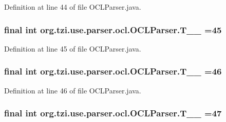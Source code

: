 Definition at line 44 of file O\-C\-L\-Parser.\-java.

\hypertarget{classorg_1_1tzi_1_1use_1_1parser_1_1ocl_1_1_o_c_l_parser_ae6ad4517bc192f2ec9659901e71326a9}{
\subsubsection[{T\-\_\-\-\_\-45}]{\setlength{\rightskip}{0pt plus 5cm}final int org.\-tzi.\-use.\-parser.\-ocl.\-O\-C\-L\-Parser.\-T\-\_\-\-\_ =45\hspace{0.3cm}{\ttfamily [static]}}}\label{classorg_1_1tzi_1_1use_1_1parser_1_1ocl_1_1_o_c_l_parser_ae6ad4517bc192f2ec9659901e71326a9}


Definition at line 45 of file O\-C\-L\-Parser.\-java.

\hypertarget{classorg_1_1tzi_1_1use_1_1parser_1_1ocl_1_1_o_c_l_parser_a8dc8e81bf19205be5df0475ac9de130c}{
\subsubsection[{T\-\_\-\-\_\-46}]{\setlength{\rightskip}{0pt plus 5cm}final int org.\-tzi.\-use.\-parser.\-ocl.\-O\-C\-L\-Parser.\-T\-\_\-\-\_ =46\hspace{0.3cm}{\ttfamily [static]}}}\label{classorg_1_1tzi_1_1use_1_1parser_1_1ocl_1_1_o_c_l_parser_a8dc8e81bf19205be5df0475ac9de130c}


Definition at line 46 of file O\-C\-L\-Parser.\-java.

\hypertarget{classorg_1_1tzi_1_1use_1_1parser_1_1ocl_1_1_o_c_l_parser_a09fee6e13cf0bcd30e88efb12cf3fdf3}{
\subsubsection[{T\-\_\-\-\_\-47}]{\setlength{\rightskip}{0pt plus 5cm}final int org.\-tzi.\-use.\-parser.\-ocl.\-O\-C\-L\-Parser.\-T\-\_\-\-\_ =47\hspace{0.3cm}{\ttfamily [static]}}}\label{classorg_1_1tzi_1_1use_1_1parser_1_1ocl_1_1_o_c_l_parser_a09fee6e13cf0bcd30e88efb12cf3fdf3}


